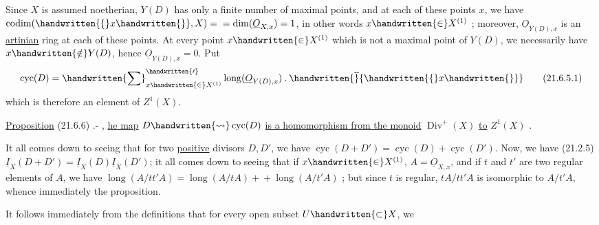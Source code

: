 Since $X$ is assumed noetherian, $Y(D)$ has only a finite number of maximal points, and at each of these points $x$, we have $\operatorname{codim}(\handwritten{\{}x\handwritten{\}},X)={}\allowbreak{}=\operatorname{dim}(\underline O_{X,x})=1$, in other words $x\handwritten{\in}X^{(1)}$ ;
\normalmarginpar
{} moreover, $\underline O_{Y(D),x}$ is an \uline{artinian} ring at each of these points. At every point $x\handwritten{\in}X^{(1)}$ which is not a maximal point of $Y(D)$, we necessarily have $x\handwritten{\notin}Y(D)$, hence $\underline O_{Y(D),x}=0$. Put
\[
  \operatorname{cyc}(D)=\handwritten{\sum}^{\handwritten{\prime}}_{x\handwritten{\in}X^{(1)}}
  \operatorname{long}(\underline O_{Y(D),x})\mathbin{.}\handwritten{\overline}{\handwritten{\{}x\handwritten{\}}}
  \tag*{(21.6.5.1)}
\]
which is therefore an element of $Z^{1}(X)$.

\uline{Proposition} (21.6.6) .- , \uline{he map} $D\handwritten{\leadsto}\operatorname{cyc}(D)$\deleted{\unsure{;}} \uline{is a homomorphism from the monoid} $\operatorname{Div}^{+}(X)$ \uline{to} $Z^{1}(X)$ .

It all comes down to seeing that for two \uline{positive} divisors $D,D'$, we have $\operatorname{cyc}(D+D')=\operatorname{cyc}(D)+\operatorname{cyc}(D')$. Now, we have (21.2.5) $\underline I_{X}(D+D')=\underline I_{X}(D)\underline I_{X}(D')$; it all comes down to seeing that if $x\handwritten{\in}X^{(1)}$,  $A=\underline O_{X,x}$, and if $t$ and $t'$ are two regular elements of $A$, we have $\operatorname{long}(A/tt'A)=\operatorname{long}(A/tA)+{}\allowbreak{}+\operatorname{long}(A/t'A)$ ; but since  $t$ is regular, $tA/tt'A$ is isomorphic to $A/t'A$, whence  immediately the proposition.

It follows immediately from the definitions that for every open subset $U\handwritten{\subset}X$, we
